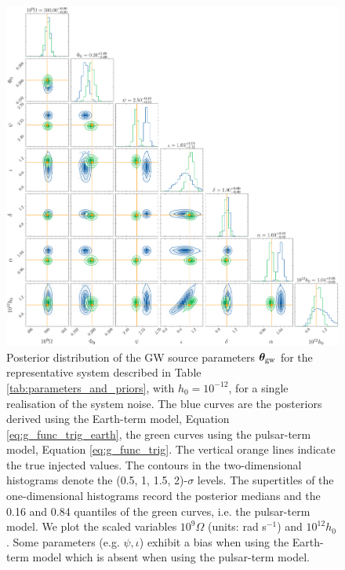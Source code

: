 \documentclass[fleqn,usenatbib,useAMS]{mnras}
\begin{document}
	\begin{figure}
	\includegraphics[width=\textwidth, height =\textwidth ]{images/corner_highSNR_compare}
	\caption{Posterior distribution of the GW source parameters $\boldsymbol{\theta}_{\rm gw}$ for the representative system described in Table \ref{tab:parameters_and_priors}, with $h_0 = 10^{-12}$, for a single realisation of the system noise. The blue curves are the posteriors derived using the Earth-term model, Equation \eqref{eq:g_func_trig_earth}, the green curves using the pulsar-term model, Equation \eqref{eq:g_func_trig}. The vertical orange lines indicate the true injected values. The contours in the two-dimensional histograms denote the (0.5, 1, 1.5, 2)-$\sigma$ levels. The supertitles of the one-dimensional histograms record the posterior medians and the 0.16 and 0.84 quantiles of the green curves, i.e. the pulsar-term model. We plot the scaled variables $10^9 \Omega$ (units: rad s$^{-1}$) and $10^{12} h_0$. Some parameters (e.g. $\psi, \iota$) exhibit a bias when using the Earth-term model which is absent when using the pulsar-term model.}
	\label{fig:corner_plot_compare_high}
\end{figure}
\end{document}
